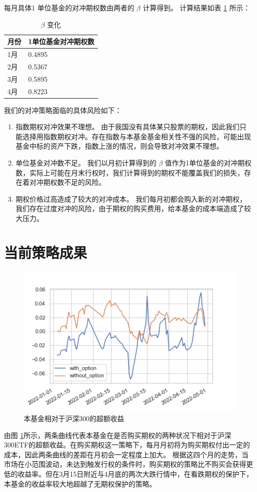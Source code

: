 \documentclass[a4paper,12pt]{ctexart}
\begin{document}
每月具体1 单位基金的对冲期权数由两者的 \(\beta\) 计算得到。
计算结果如表 \ref{beta} 所示：
\begin{table}[htbp]
	\centering
	\begin{tabular}{ll}
		月份 & 1单位基金对冲期权数 \\\hline
		1月 & 0.4895       \\
		2月 & 0.5367       \\
		3月 & 0.5895       \\
		4月 & 0.8223       \\
	\end{tabular}
	\caption{\(\beta\) 变化}
	\label{beta}
\end{table}
我们的对冲策略面临的具体风险如下：
\begin{enumerate}
	\item 指数期权对冲效果不理想。
	      由于我国没有具体某只股票的期权，因此我们只能选择用指数期权对冲。存在指数与本基金基金相关性不强的风险，可能出现基金中标的资产下跌，指数上涨的情况，则会导致对冲效果不理想。
	\item 单位基金对冲数不足。
	      我们以月初计算得到的 \(\beta\) 值作为1单位基金的对冲期权数，实际上可能在月末行权时，我们计算得到的期权不能覆盖我们的损失，存在着对冲期权数不足的风险。
	\item 期权价格过高造成了较大的对冲成本。
	      我们每月初都会购入新的对冲期权，我们存在过度对冲的风险，由于期权的购买费用，给本基金的成本端造成了较大压力。
\end{enumerate}

\section{当前策略成果}
\begin{figure}[h]
    \centering
    \includegraphics[width=0.8\linewidth]{./lib/result/result1.png}
    \caption{本基金相对于沪深300的超额收益}
    \label{fig:300etf}
\end{figure}
由图 \ref{fig:300etf}所示，两条曲线代表本基金在是否购买期权的两种状况下相对于沪深300ETF的超额收益。在购买期权这一策略下，每月月初将为购买期权付出一定的成本，因此两条曲线的差距在月初会一定程度上加大。
	根据这四个月的走势，当市场在小范围波动，未达到触发行权的条件时，购买期权的策略比不购买会获得更低的收益率。但在3月15日附近与4月底的两次大跌行情中，在看跌期权的保护下，本基金的收益率较大地超越了无期权保护的策略。
 
\end{document}

